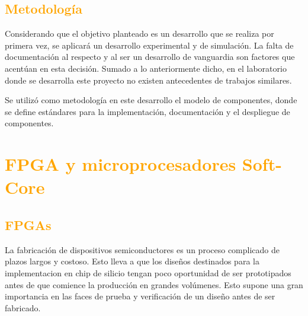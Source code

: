 \documentclass[a4paper,11pt]{article}
\begin{document}
\subsection{\textcolor{orange}{Metodología}}

Considerando que el objetivo planteado es un desarrollo que se realiza por primera vez, se aplicará un desarrollo experimental y de simulación. La falta de documentación al respecto y al ser un desarrollo de vanguardia son factores que acentúan en esta decisión. Sumado a lo anteriormente dicho, en el laboratorio donde se desarrolla este proyecto no existen antecedentes de trabajos similares.
 
Se utilizó como metodología en este desarrollo el modelo de componentes, donde se define estándares para la implementación, documentación y el despliegue de componentes. 



\section{\textcolor{orange}{FPGA y microprocesadores Soft-Core}}%
	\subsection{\textcolor{orange}{FPGAs}}

La fabricación de dispositivos semiconductores es un proceso complicado de plazos largos y costoso. Esto lleva a que los diseños destinados para la  implementacion en chip de silicio tengan poco oportunidad de ser prototipados antes de que comience la producción en grandes volúmenes. Esto supone una gran importancia  en las faces de prueba y verificación de un diseño antes de ser fabricado.
\end{document}
